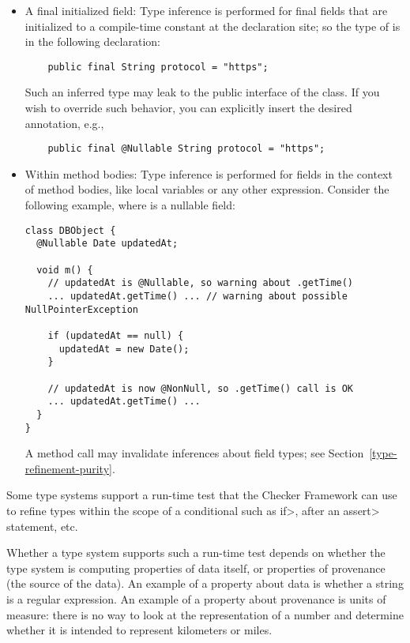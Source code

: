 \begin{itemize}

\item
A final initialized field:
Type inference is performed for final fields that are initialized to a
compile-time constant at the declaration site; so the type of 
is  in the following declaration:

\begin{Verbatim}
    public final String protocol = "https";
\end{Verbatim}

Such an inferred type may leak to the public interface of the class.
If you wish to override such behavior, you can explicitly insert the desired
annotation, e.g.,

\begin{Verbatim}
    public final @Nullable String protocol = "https";
\end{Verbatim}

\item
Within method bodies:
Type inference is performed for fields in the context of method bodies,
like local variables or any other expression.
Consider the following example, where  is a nullable
field:

\begin{Verbatim}
class DBObject {
  @Nullable Date updatedAt;

  void m() {
    // updatedAt is @Nullable, so warning about .getTime()
    ... updatedAt.getTime() ... // warning about possible NullPointerException

    if (updatedAt == null) {
      updatedAt = new Date();
    }

    // updatedAt is now @NonNull, so .getTime() call is OK
    ... updatedAt.getTime() ...
  }
}
\end{Verbatim}

A method call may invalidate inferences about field types; see
Section~\ref{type-refinement-purity}.

\end{itemize}



Some type systems support a run-time test that the Checker Framework can
use to refine types within the scope of a conditional such as \<if>, after
an \<assert> statement, etc.

Whether a type system supports such a run-time test depends on whether the
type system is computing properties of data itself, or properties of
provenance (the source of the data).  An example of a property about data is
whether a string is a regular expression.  An example of a property about
provenance is units of measure:  there is no way to look at the
representation of a number and determine whether it is intended to
represent kilometers or miles.

